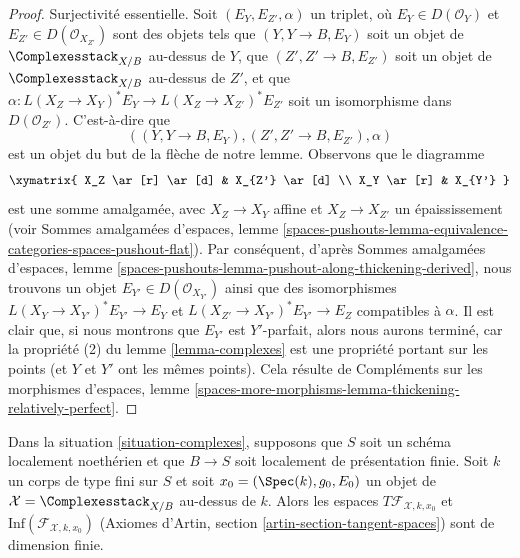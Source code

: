 \begin{proof}
\medskip\noindent
Surjectivité essentielle. Soit $(E_Y, E_{Z'}, \alpha)$ un triplet, où
$E_Y \in D(\mathcal{O}_Y)$ et $E_{Z'} \in D(\mathcal{O}_{X_{Z'}})$ sont des
objets tels que $(Y, Y \to B, E_Y)$ soit un objet de
$\Complexesstack_{X/B}$ au-dessus de $Y$, que
$(Z', Z' \to B, E_{Z'})$ soit un objet de $\Complexesstack_{X/B}$ au-dessus de
$Z'$, et que
$\alpha : L(X_Z \to X_Y)^*E_Y \to L(X_Z \to X_{Z'})^*E_{Z'}$
soit un isomorphisme dans $D(\mathcal{O}_{Z'})$.
C'est-à-dire que
$$
((Y, Y \to B, E_Y), (Z', Z' \to B, E_{Z'}), \alpha)
$$
est un objet du but de la flèche de notre lemme.
Observons que le diagramme
$$
\xymatrix{
X_Z \ar[r] \ar[d] & X_{Z'} \ar[d] \\
X_Y \ar[r] & X_{Y'}
}
$$
est une somme amalgamée, avec $X_Z \to X_Y$ affine et
$X_Z \to X_{Z'}$ un épaississement
(voir Sommes amalgamées d'espaces, lemme
\ref{spaces-pushouts-lemma-equivalence-categories-spaces-pushout-flat}).
Par conséquent, d'après Sommes amalgamées d'espaces, lemme
\ref{spaces-pushouts-lemma-pushout-along-thickening-derived},
nous trouvons un objet $E_{Y'} \in D(\mathcal{O}_{X_{Y'}})$ ainsi que des
isomorphismes
$L(X_Y \to X_{Y'})^*E_{Y'} \to E_Y$ et
$L(X_{Z'} \to X_{Y'})^*E_{Y'} \to E_Z$
compatibles à $\alpha$. Il est clair que, si nous montrons que $E_{Y'}$ est
$Y'$-parfait, alors nous aurons terminé, car la propriété (2) du
lemme \ref{lemma-complexes} est une propriété portant sur les points (et $Y$
et $Y'$ ont les mêmes points).
Cela résulte de Compléments sur les morphismes d'espaces, lemme
\ref{spaces-more-morphisms-lemma-thickening-relatively-perfect}.
\end{proof}

\begin{lemma}
\label{lemma-complexes-tangent-space}
Dans la situation \ref{situation-complexes}, supposons que $S$ soit un schéma
localement noethérien et que $B \to S$ soit localement de présentation finie.
Soit $k$ un corps de type fini sur $S$ et soit
$x_0 = (\Spec(k), g_0, E_0)$ un objet de
$\mathcal{X} = \Complexesstack_{X/B}$ au-dessus de $k$.
Alors les espaces $T\mathcal{F}_{\mathcal{X}, k, x_0}$ et
$\text{Inf}(\mathcal{F}_{\mathcal{X}, k, x_0})$
(Axiomes d'Artin, section \ref{artin-section-tangent-spaces})
sont de dimension finie.
\end{lemma}

